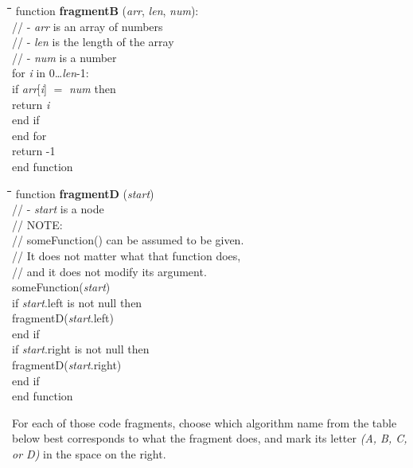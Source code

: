 \documentclass[a4paper]{article}
\begin{document}
\hfill%
\begin{minipage}[t]{0.44\columnwidth}
  
  \begin{tabbing}
    \quad\=\quad\=\quad\=\quad\=\quad\=\kill
    function \textbf{fragmentB} (\emph{arr}, \emph{len}, \emph{num}):\\
    \>// - \emph{arr} is an array of numbers\\
    \>// - \emph{len} is the length of the array\\
    \>// - \emph{num} is a number\\
    \>for \emph{i} in 0\ldots\emph{len}-1:\\
    \>\>if \emph{arr}[\emph{i}] $=$ \emph{num} then\\
    \>\>\>return \emph{i}\\
    \>\>end if\\
    \>end for\\
    \>return -1\\
    end function
  \end{tabbing}
  
  \begin{tabbing}
    \quad\=\quad\=\quad\=\quad\=\quad\=\kill
    function \textbf{fragmentD} (\emph{start})\\
    \>// - \emph{start} is a node\\
    \>// NOTE:\\
    \>// \quad someFunction() can be assumed to be given.\\
    \>// \quad It does not matter what that function does,\\
    \>// \quad and it does not modify its argument.\\
    \>someFunction(\emph{start})\\
    \>if \emph{start}.left is not null then\\
    \>\>fragmentD(\emph{start}.left)\\
    \>end if\\
    \>if \emph{start}.right is not null then\\
    \>\>fragmentD(\emph{start}.right)\\
    \>end if\\
    end function
  \end{tabbing}
\end{minipage}
\normalsize
\vspace{\baselineskip}

For each of those code fragments, choose which algorithm name from the table below best corresponds to what the fragment does, and mark its letter \emph{(A, B, C, or D)} in the space on the right.
\end{document}
